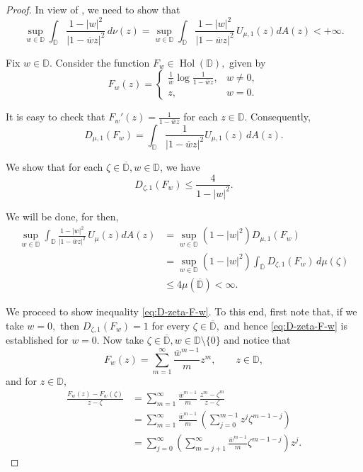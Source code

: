 \documentclass[10pt,oneside,reqno]{amsart}
\theoremstyle{definition}
\theoremstyle{remark}
\newcommand{\abs}[1]{\left\lvert #1 \right\rvert}
\renewcommand{\le}{\leqslant}
\newcommand{\D}{\mathbb D}
\numberwithin{equation}{section}
\begin{document}
\begin{proof}
    In view of \cite[Chapter VI, Lemma 3.3]{MR2261424}, we need to show that 
\begin{equation*}
    \sup_{w\in \D} \int_{\D} \frac{1-\abs{w}^2}{\abs{1-\overline{w}z}^2}\, d\nu (z) = \sup_{w\in \D} \int_{\D} \frac{1-\abs{w}^2}{\abs{1-\overline{w}z}^2}\, U_{\mu,1} (z) dA (z) < +\infty.
\end{equation*}

Fix $w\in \D$. Consider the function $F_{w} \in\operatorname{Hol}(\D),$ given by 
\begin{equation*}
    F_w (z) = \begin{cases}
        \frac{1}{\overline{w}} \log \frac{1}{1-\overline{w}z}, & w\ne 0, \\
        z, & w=0.
    \end{cases}
\end{equation*}

It is easy to check that $F_w ' (z) = \frac{1}{1-\overline{w}z}$ for each $z \in \D$. Consequently, 
\begin{equation*}
    D_{\mu, 1} (F_w) = \int_{\D} \frac{1}{\abs{1-\overline{w}z}^2} U_{\mu,1} (z) \, dA(z).
\end{equation*}

We show that for each $\zeta\in \overline{\D}, w \in \D$, we have
\begin{equation}
    D_{\zeta,1} (F_w) \le \frac{4}{1-\abs{w}^2}.
    \label{eq:D-zeta-F-w}
\end{equation}

We will be done, for then, 
\begin{align*}
    \sup_{w\in \D} \int_{\D} \frac{1-\abs{w}^2}{\abs{1-\overline{w}z}^2}\, U_{\mu} (z) dA (z) &= \sup_{w \in \D} (1-\abs{w}^2) D_{\mu, 1} (F_w) \\
    &= \sup_{w\in \D} (1-\abs{w}^2) \int_{\overline{\D}} D_{\zeta, 1} (F_w) \, d\mu (\zeta) \\
    &\le 4\mu(\overline{\D}) < \infty.
\end{align*}

We proceed to show inequality \eqref{eq:D-zeta-F-w}. To this end, first note that, if we take $w=0,$ then $D_{\zeta,1}(F_w)= 1$ for every $\zeta\in \overline{\D},$ and hence \eqref{eq:D-zeta-F-w} is established for $w=0.$  Now take $\zeta\in \overline{\D}, w \in \D \setminus \{0\}$ and notice that
\begin{equation*}
    F_w (z) = \sum_{m=1}^{\infty} \frac{\overline{w}^{m-1}}{m} z^m, \qquad z\in \D,
\end{equation*}
and for $z\in \D$,
\begin{align*}
    \frac{F_w (z)-F_w (\zeta)}{z-\zeta} &= \sum_{m=1}^{\infty} \frac{\overline{w}^{m-1}}{m}\, \frac{z^m - \zeta^m}{z-\zeta} \\
    &= \sum_{m=1}^{\infty} \frac{\overline{w}^{m-1}}{m}\, \left( \sum_{j=0}^{m-1} z^{j} \zeta^{m-1-j}\right) \\
    &= \sum_{j=0}^{\infty} \left( \sum_{m=j+1}^{\infty} \frac{\overline{w}^{m-1}}{m} \zeta ^{m-1-j} \right) z^j.
\end{align*}


\end{proof}
\end{document}
